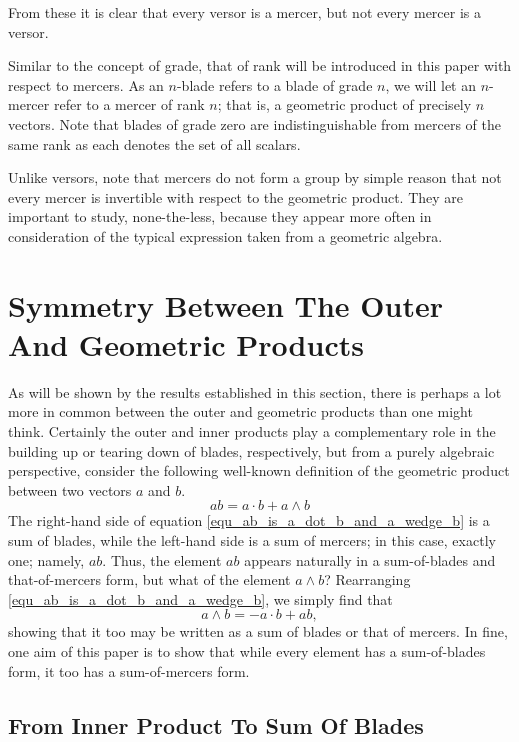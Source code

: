\documentclass{birkjour}
\theoremstyle{definition}
\theoremstyle{remark}
\numberwithin{equation}{section}
\begin{document}
From these it is clear that every versor is a mercer, but not every mercer is a versor.

Similar to the concept of grade, that of rank will be introduced in this paper with respect to mercers.  As an $n$-blade
refers to a blade of grade $n$, we will let an $n$-mercer refer to a mercer of rank $n$; that is, a geometric
product of precisely $n$ vectors.  Note that blades of grade zero
are indistinguishable from mercers of the same rank as each denotes the set of all scalars.

Unlike versors, note that mercers do not form a group by simple reason that not every
mercer is invertible with respect to the geometric product.  They are important to study, none-the-less,
because they appear more often in consideration of the typical expression taken from a geometric algebra.

\section{Symmetry Between The Outer And Geometric Products}

As will be shown by the results established in this section, there is perhaps a lot more in
common between the outer and geometric products than one might think.  Certainly the outer and
inner products play a complementary role in the building up or tearing down of blades, respectively, but from a
purely algebraic perspective, consider the following well-known definition of the geometric product
between two vectors $a$ and $b$.
\begin{equation}\label{equ_ab_is_a_dot_b_and_a_wedge_b}
ab = a\cdot b + a\wedge b
\end{equation}
The right-hand side of equation \eqref{equ_ab_is_a_dot_b_and_a_wedge_b} is a sum of blades, while the left-hand side is a sum of mercers;
in this case, exactly one; namely, $ab$.  Thus, the element $ab$ appears naturally in a sum-of-blades and
that-of-mercers form, but what of the element $a\wedge b$?  Rearranging \eqref{equ_ab_is_a_dot_b_and_a_wedge_b}, we simply find that
\begin{equation}
a\wedge b = -a\cdot b + ab,
\end{equation}
showing that it too may be written as a sum of blades or that of mercers.  In fine, one aim of this paper
is to show that while every element has a sum-of-blades form, it too has a sum-of-mercers form.

\subsection{From Inner Product To Sum Of Blades}
\end{document}

